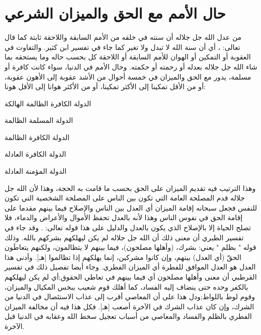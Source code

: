 \section{حال الأمم مع الحق والميزان الشرعي}

من عدل الله جل جلاله أن سنته في خلقه من الأمم السابقة واللاحقة ثابتة كما قال تعالى: \quranayah*[33][62]{\footnotesize \surahname*[33]}، أي أن سنة الله لا تبدل ولا تغير كما جاء في تفسير ابن كثير. والتفاوت في العقوبة أو التمكين أو الهوان للأمم السابقة أو اللاحقة كل بحسب حاله وما يستحقه بما شاء الله جل جلاله بعدله أو رحمته أو حكمته. وحال الأمم في الدنيا، سواء كانت كافرة أو مسلمة،  يدور مع الحق والميزان في خمسة أحوال من الأشد عقوبة إلى الأهون عقوبة، أو من الأقل تمكينا إلى الأكثر تمكينا، أو من الأكثر هوانا إلى الأقل هونا:

\begin{compactitem}
    \item الدولة الكافرة الظالمة الهالكة
    \item الدولة المسلمة الظالمة
    \item الدولة الكافرة الظالمة
    \item الدولة الكافرة العادلة
    \item الدولة المؤمنة العادلة
\end{compactitem}

وهذا الترتيب فيه تقديم الميزان على الحق بحسب ما قامت به الحجة، وهذا لأن الله جل جلاله قدم المصلحة العامة التي تكون بين الناس على المصلحة الشخصية التي تكون للنفس فجعل سبحانه إقامة الميزان أي العدل بين الناس والإصلاح فيما بينهم مقدما على إقامة الحق في نفوس الناس وهذا لأنه بالعدل تحفظ الأموال والأعراض والدماء، فلا تصلح الحياة إلا بالإصلاح الذي يكون بالعدل والدليل على هذا قوله تعالى: \quranayah*[11][117]{\footnotesize \surahname*[11]}. وقد جاء في تفسير الطبري أن معنى ذلك أن الله جل جلاله لم يكن ليهلكهم بشركهم بالله. وذلك قوله " بظلم " يعني: بشرك، (وأهلها مصلحون)، فيما بينهم لا يتظالمون، ولكنهم يتعاطَون الحقّ (أي العدل) بينهم، وإن كانوا مشركين، إنما يهلكهم إذا تظالموا [هـ]. وأدنى هذا العدل هو العدل الموافق للفطرة أي الميزان الفطري. وجاء أيضا تفصيل ذلك في تفسير القرطبي أن معنى وأهلها مصلحون أي فيما بينهم في تعاطي الحقوق;أي لم يكن ليهلكهم بالكفر وحده حتى ينضاف إليه الفساد، كما أهلك قوم شعيب ببخس المكيال والميزان، وقوم لوط باللواط;ودل هذا على أن المعاصي أقرب إلى عذاب الاستئصال في الدنيا من الشرك، وإن كان عذاب الشرك في الآخرة أصعب [هـ]. فكل هذا فيه أن مخالفة الميزان الفطري بالظلم والفساد والمعاصي من أسباب تعجيل سخط الله وعقابه في الدنيا قبل الآخرة. 

